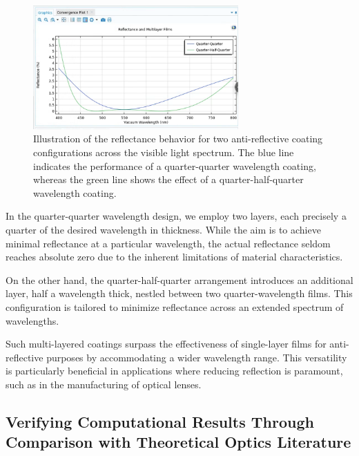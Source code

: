\begin{figure}[H]
  \centering
  \includegraphics[width=0.7\textwidth]{Chapters/Figures/Chapter 4 Figures/Quarter-Half-Quarter.png}
  \caption{Illustration of the reflectance behavior for two anti-reflective coating configurations across the visible light spectrum. The blue line indicates the performance of a quarter-quarter wavelength coating, whereas the green line shows the effect of a quarter-half-quarter wavelength coating.}
  \label{fig:both quarter-quarter and quarter-half-quarter}
\end{figure}

In the quarter-quarter wavelength design, we employ two layers, each precisely a quarter of the desired wavelength in thickness. While the aim is to achieve minimal reflectance at a particular wavelength, the actual reflectance seldom reaches absolute zero due to the inherent limitations of material characteristics.

On the other hand, the quarter-half-quarter arrangement introduces an additional layer, half a wavelength thick, nestled between two quarter-wavelength films. This configuration is tailored to minimize reflectance across an extended spectrum of wavelengths.

Such multi-layered coatings surpass the effectiveness of single-layer films for anti-reflective purposes by accommodating a wider wavelength range. This versatility is particularly beneficial in applications where reducing reflection is paramount, such as in the manufacturing of optical lenses.


\subsection{Verifying Computational Results Through Comparison with Theoretical Optics Literature}

